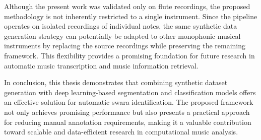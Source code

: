 Although the present work was validated only on flute recordings, the proposed methodology is not inherently restricted to a single instrument. Since the pipeline operates on isolated recordings of individual notes, the same synthetic data generation strategy can potentially be adapted to other monophonic musical instruments by replacing the source recordings while preserving the remaining framework. This flexibility provides a promising foundation for future research in automatic music transcription and music information retrieval.

In conclusion, this thesis demonstrates that combining synthetic dataset generation with deep learning-based segmentation and classification models offers an effective solution for automatic swara identification. The proposed framework not only achieves promising performance but also presents a practical approach for reducing manual annotation requirements, making it a valuable contribution toward scalable and data-efficient research in computational music analysis.
